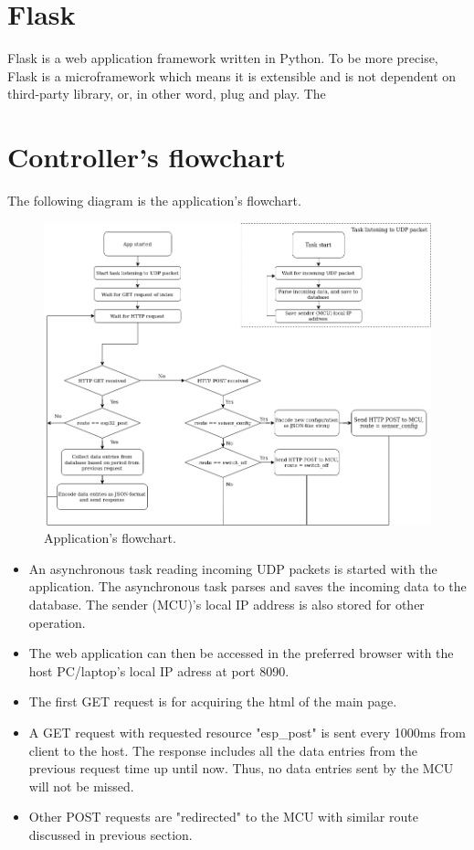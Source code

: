 \documentclass[../main.tex]{subfiles}
\begin{document}
    \section{Flask}    \label{sec:flask}
    Flask is a web application framework written in Python. To be more precise, Flask is a microframework which means it is extensible and is not dependent on third-party library, or, in other word, plug and play. The 

    \pagebreak
    \section{Controller's flowchart} \label{sec:application_flowchart}
    The following diagram is the application's flowchart.
    \begin{figure}[!h]
        \centerline{\includegraphics[scale=0.5]{media/appliation_flowchart.drawio.png}}
        \caption{Application's flowchart.}
        \label{fig:application_flowchart}
    \end{figure}

    \justify
    \begin{itemize} 
        \item An asynchronous task reading incoming UDP packets is started with the application. The asynchronous task parses and saves the incoming data to the database. The sender (MCU)'s local IP address is also stored for other operation.
        \item The web application can then be accessed in the preferred browser with the host PC/laptop's local IP adress at port 8090.
        \item The first GET request is for acquiring the html of the main page.
        \item A GET request with requested resource "esp\_post" is sent every 1000ms from client to the host. The response includes all the data entries from the previous request time up until now. Thus, no data entries sent by the MCU will not be missed.
        \item Other POST requests are "redirected" to the MCU with similar route discussed in previous section.
    \end{itemize}
\end{document}
